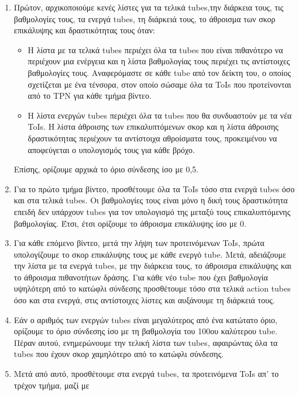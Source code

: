 \begin{enumerate}
\item Πρώτον, αρχικοποιούμε  κενές λίστες για τα τελικά \en tubes\gr,την διάρκεια τους, τις βαθμολογίες τους, τα ενεργά \en tubes\gr,
  τη διάρκειά τους, το άθροισμα των σκορ επικάλυψης  και δραστικότητας τους όταν:
  \begin{itemize}
  \item Η λίστα με τα τελικά \en tubes \gr περιέχει όλα τα \en tubes  \gr που είναι πιθανότερο να περιέχουν μια ενέργεια και η λίστα
    βαθμολογίας τους περιέχει τις αντίστοιχες βαθμολογίες τους. Αναφερόμαστε σε κάθε \en tube \gr από τον δείκτη του, ο οποίος
    σχετίζεται με ένα τένσορα, στον οποίο σώσαμε όλα τα \en ToIs \gr που προτείνονται από το \en TPN \gr για κάθε τμήμα βίντεο.
  \item Η λίστα ενεργών \en tubes \gr περιέχει όλα τα \en tubes \gr που θα συνδυαστούν με τα νέα \en  ToIs\gr.
    Η  λίστα άθροισης των επικαλυπτόμενων σκορ  και η λίστα άθροισης δραστικότητας περιέχουν τα αντίστοιχα αθροίσματα τους,
    προκειμένου να αποφεύγεται ο υπολογισμός τους για κάθε βρόχο. 
  \end{itemize}
Επίσης, ορίζουμε αρχικά  το όριο σύνδεσης ίσο με 0,5.
\item Για το πρώτο τμήμα βίντεο, προσθέτουμε όλα τα \en ToIs \gr τόσο στα ενεργά \en tubes \gr όσο και στα τελικά \en tubes\gr.
  Οι βαθμολογίες τους είναι μόνο η δική τους δραστικότητα επειδή δεν υπάρχουν \en tubes \gr για τον υπολογισμό της μεταξύ τους
  επικαλυπτόμενης βαθμολογίας. Έτσι, έτσι ορίζουμε το άθροισμα επικάλυψης ίσο με 0.
\item Για κάθε επόμενο βίντεο, μετά την λήψη των προτεινόμενων \en ToIs\gr, πρώτα υπολογίζουμε το σκορ επικάλυψης τους με κάθε
  ενεργό \en tube\gr. Μετά, αδειάζουμε την λίστα με τα ενεργά \en tubes\gr, με την διάρκεια τους, το άθροισμα επικάλυψης και το
  άθροισμα πιθανοτήτων δράσης. Για κάθε νέο \en tube \gr που έχει βαθμολογία υψηλότερη από το κατώφλι σύνδεσης
  προσθέτουμε τόσο στα τελικά \en action tubes \gr όσο και στα ενεργά, στις αντίστοιχες λίστες και αυξάνουμε τη διάρκειά τους.
\item Εάν ο αριθμός των ενεργών \en tubes \gr είναι μεγαλύτερος από ένα κατώτατο όριο, ορίζουμε το  όριο σύνδεσης ίσο με τη βαθμολογία του
  100ου καλύτερου \en tube\gr. Πέραν αυτού, ενημερώνουμε την τελική λίστα των \en tubes\gr, αφαιρώντας όλα τα \en tubes \gr
  που έχουν σκορ χαμηλότερο από το κατώφλι σύνδεσης.
\item Μετά από αυτό, προσθέτουμε στα ενεργά \en tubes\gr, τα προτεινόμενα \en ToIs \gr απ' το τρέχον τμήμα, μαζί με

\end{enumerate}
